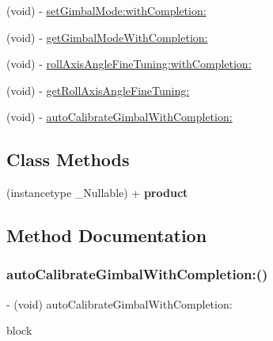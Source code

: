 \begin{DoxyCompactItemize}
\item 
(void) -\/ \hyperlink{interface_p_v_gimabal_ac2bc32c8869d1f5f36c87eb47313fc7e}{set\+Gimbal\+Mode\+:with\+Completion\+:}
\item 
(void) -\/ \hyperlink{interface_p_v_gimabal_a05eb12c923045267506ab6afc2f97275}{get\+Gimbal\+Mode\+With\+Completion\+:}
\item 
(void) -\/ \hyperlink{interface_p_v_gimabal_af41d05f3ab40b6d7cd6bf8c1cd899da8}{roll\+Axis\+Angle\+Fine\+Tuning\+:with\+Completion\+:}
\item 
(void) -\/ \hyperlink{interface_p_v_gimabal_ae4e3e7f2c3e3672a56bd67a8b9212aea}{get\+Roll\+Axis\+Angle\+Fine\+Tuning\+:}
\item 
(void) -\/ \hyperlink{interface_p_v_gimabal_af1ee8faf83afdcbca2f5ff41bc50217b}{auto\+Calibrate\+Gimbal\+With\+Completion\+:}
\end{DoxyCompactItemize}
\subsection*{Class Methods}
\begin{DoxyCompactItemize}
\item 
\mbox{\label{interface_p_v_gimabal_adbba846a1efa1ed2c7e55c32e84f9427}} 
(instancetype \+\_\+\+Nullable) + {\bfseries product}
\end{DoxyCompactItemize}


\subsection{Method Documentation}
\mbox{\label{interface_p_v_gimabal_af1ee8faf83afdcbca2f5ff41bc50217b}} 
\subsubsection{\texorpdfstring{auto\+Calibrate\+Gimbal\+With\+Completion\+:()}{autoCalibrateGimbalWithCompletion:()}}
{\footnotesize\ttfamily -\/ (void) auto\+Calibrate\+Gimbal\+With\+Completion\+: \begin{DoxyParamCaption}\item[{(P\+V\+Completion\+Block)}]{block }\end{DoxyParamCaption}}

